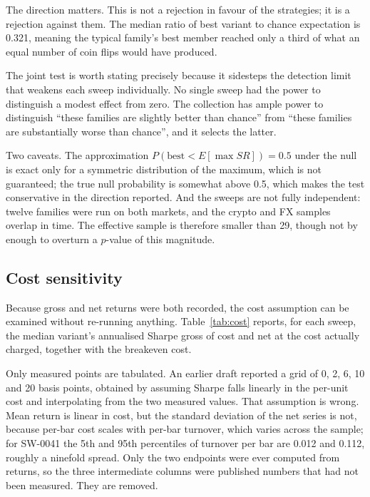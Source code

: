 \documentclass[11pt,a4paper]{article}
\begin{document}
The direction matters. This is not a rejection in favour of the strategies; it
is a rejection against them. The median ratio of best variant to chance
expectation is 0.321, meaning the typical family's best member reached only a
third of what an equal number of coin flips would have produced.

The joint test is worth stating precisely because it sidesteps the detection
limit that weakens each sweep individually. No single sweep had the power to
distinguish a modest effect from zero. The collection has ample power to
distinguish ``these families are slightly better than chance'' from ``these
families are substantially worse than chance'', and it selects the latter.

Two caveats. The approximation $P(\text{best} < E[\max SR]) = 0.5$ under the
null is exact only for a symmetric distribution of the maximum, which is not
guaranteed; the true null probability is somewhat above 0.5, which makes the
test conservative in the direction reported. And the sweeps are not fully
independent: twelve families were run on both markets, and the crypto and
FX samples overlap in time. The effective sample is therefore smaller than 29,
though not by enough to overturn a $p$-value of this magnitude.

\subsection{Cost sensitivity}
\label{sec:cost}

Because gross and net returns were both recorded, the cost assumption can be
examined without re-running anything. Table~\ref{tab:cost} reports, for each sweep, the
median variant's annualised Sharpe gross of cost and net at the cost actually
charged, together with the breakeven cost.

Only measured points are tabulated. An earlier draft reported a grid of 0, 2,
6, 10 and 20 basis points, obtained by assuming Sharpe falls linearly in the
per-unit cost and interpolating from the two measured values. That assumption
is wrong. Mean return is linear in cost, but the standard deviation of the net
series is not, because per-bar cost scales with per-bar turnover, which varies
across the sample; for SW-0041 the 5th and 95th percentiles of turnover per
bar are 0.012 and 0.112, roughly a ninefold spread. Only the two endpoints
were ever computed from returns, so the three intermediate columns were
published numbers that had not been measured. They are removed.
\end{document}
